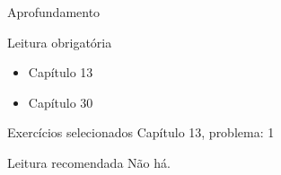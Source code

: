 \documentclass{beamer}
\begin{document}
\begin{frame}{Aprofundamento}
  \begin{block}{Leitura obrigatória}
    \begin{itemize}
    \item Capítulo 13
    \item Capítulo 30
    \end{itemize}
  \end{block}
  \begin{block}{Exercícios selecionados}
    \small
    Capítulo 13, problema: 1
  \end{block}
  \begin{block}{Leitura recomendada}
    \small
    Não há.
  \end{block}
\end{frame}
\end{document}
